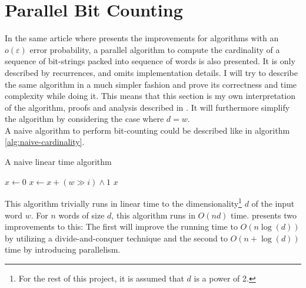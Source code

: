 \section{Parallel Bit Counting}
In the same article where \citet{fast-similarity-search} presents the improvements for algorithms with an $o(\varepsilon)$ error probability, a parallel algorithm to compute the cardinality of a sequence of bit-strings packed into sequence of words is also presented. It is only described by recurrences, and omits implementation details. I will try to describe the same algorithm in a much simpler fashion and prove its correctness and time complexity while doing it. This means that this section is my own interpretation of the algorithm, proofs and analysis described in \cite{fast-similarity-search}.
It will furthermore simplify the algorithm by considering the case where $d=w$.\\
A naive algorithm to perform bit-counting could be described like in algorithm \ref{alg:naive-cardinality}.
\begin{algorithm}[H]
\caption{A naive linear time algorithm}\label{alg:naive-cardinality}
\begin{algorithmic}[1]
 
\State $x \gets 0$
\State $x \gets x + (w \gg i) \land 1$
\EndFor
\State \Return $x$
\EndFunction
\end{algorithmic}
\end{algorithm}
This algorithm trivially runs in linear time to the dimensionality\footnote{For the rest of this project, it is assumed that $d$ is a power of 2.} $d$ of the input word $w$. For $n$ words of size $d$, this algorithm runs in $O(nd)$ time.
\citet{fast-similarity-search} presents two improvements to this: The first will improve the running time to $O(n\log(d))$ by utilizing a divide-and-conquer technique and the second to $O(n + \log(d))$ time by introducing parallelism.
